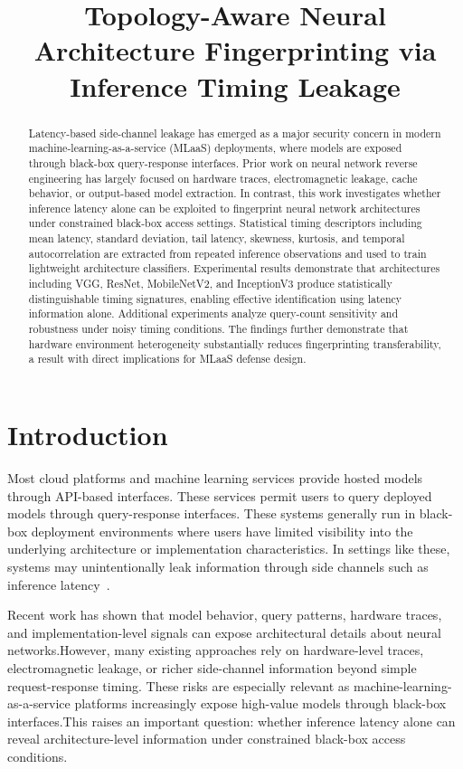 \documentclass[conference]{IEEEtran}
\title{
Topology-Aware Neural Architecture Fingerprinting via Inference Timing Leakage
}
\author{
\IEEEauthorblockN{Shlok Pandey}
\IEEEauthorblockA{
Manipal University Jaipur \\
Email: shlokpandey8219@gmail.com
}
}
\begin{document}
\raggedbottom
\maketitle


\begin{abstract}
Latency-based side-channel leakage has emerged as a major security concern in modern machine-learning-as-a-service (MLaaS) deployments, where models are exposed through black-box query-response interfaces. Prior work on neural network reverse engineering has largely focused on hardware traces, electromagnetic leakage, cache behavior, or output-based model extraction. In contrast, this work investigates whether inference latency alone can be exploited to fingerprint neural network architectures under constrained black-box access settings.
Statistical timing descriptors including mean latency, standard deviation, tail latency, skewness, kurtosis, and temporal autocorrelation are extracted from repeated inference observations and used to train lightweight architecture classifiers. Experimental results demonstrate that architectures including VGG, ResNet, MobileNetV2, and InceptionV3 produce statistically distinguishable timing signatures, enabling effective identification using latency information alone. Additional experiments analyze query-count sensitivity and robustness under noisy timing conditions. The findings further demonstrate that hardware environment heterogeneity substantially reduces fingerprinting transferability, a result with direct implications for MLaaS defense design.
\end{abstract}

\section{Introduction}

Most cloud platforms and machine learning services provide hosted models through API-based interfaces. These services permit users to query deployed models through query-response interfaces. These systems generally run in black-box deployment environments where users have limited visibility into the underlying architecture or implementation characteristics. In settings like these, systems may unintentionally leak information through side channels such as inference latency~\cite{kocher,csinn,host2020}. 


Recent work has shown that model behavior, query patterns, hardware traces, and implementation-level signals can expose architectural  details about neural networks\cite{prada,deepsniffer,csinn,host2020}.However, many existing approaches rely on hardware-level traces, electromagnetic leakage, or richer side-channel information beyond simple request-response timing. These risks are especially relevant as machine-learning-as-a-service platforms increasingly expose high-value models through black-box interfaces.This raises an important question: whether inference latency alone can reveal architecture-level information under constrained black-box access conditions.
\end{document}
